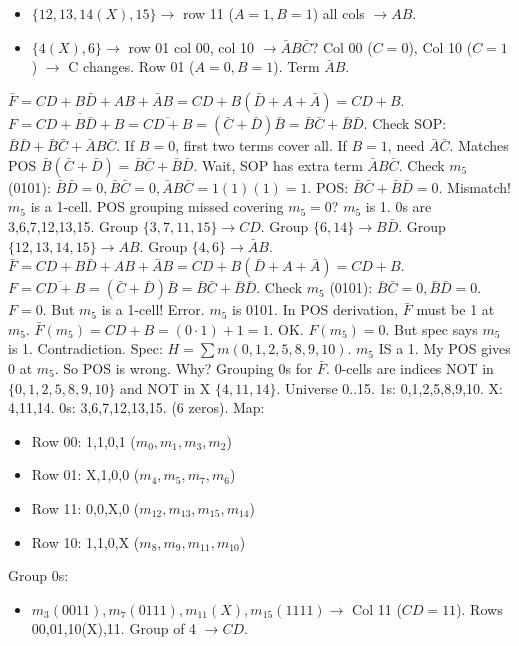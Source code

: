 \documentclass[11pt]{article}
\begin{document}
\begin{corrige}[Exercise 1]
\begin{itemize}
   \item $\{12,13,14(X),15\} \to$ row 11 ($A=1,B=1$) all cols $\to AB$.
   \item $\{4(X),6\} \to$ row 01 col 00, col 10 $\to \bar{A}B\bar{C}$? Col 00 ($C=0$), Col 10 ($C=1$) $\to$ C changes. Row 01 ($A=0,B=1$). Term $\bar{A}B$.
   \end{itemize}
   $\bar{F} = CD + B\bar{D} + AB + \bar{A}B = CD + B(\bar{D}+A+\bar{A}) = CD + B$.
   $F = \overline{CD + B\bar{D} + B} = \overline{CD + B} = (\bar{C}+\bar{D})\bar{B} = \bar{B}\bar{C} + \bar{B}\bar{D}$.
   Check SOP: $\bar{B}\bar{D} + \bar{B}\bar{C} + \bar{A}B\bar{C}$. If $B=0$, first two terms cover all. If $B=1$, need $\bar{A}\bar{C}$. Matches POS $\bar{B}(\bar{C}+\bar{D}) = \bar{B}\bar{C}+\bar{B}\bar{D}$. Wait, SOP has extra term $\bar{A}B\bar{C}$.
   Check $m_5$ (0101): $\bar{B}\bar{D}=0, \bar{B}\bar{C}=0, \bar{A}B\bar{C}=1(1)(1)=1$. POS: $\bar{B}\bar{C}+\bar{B}\bar{D} = 0$. Mismatch! $m_5$ is a 1-cell.
   POS grouping missed covering $m_5=0$? $m_5$ is 1. 0s are 3,6,7,12,13,15.
   Group $\{3,7,11,15\} \to CD$.
   Group $\{6,14\} \to B\bar{D}$.
   Group $\{12,13,14,15\} \to AB$.
   Group $\{4,6\} \to \bar{A}B$.
   $\bar{F} = CD + B\bar{D} + AB + \bar{A}B = CD + B(\bar{D}+A+\bar{A}) = CD + B$.
   $F = \overline{CD+B} = (\bar{C}+\bar{D})\bar{B} = \bar{B}\bar{C} + \bar{B}\bar{D}$.
   Check $m_5$ (0101): $\bar{B}\bar{C}=0, \bar{B}\bar{D}=0$. $F=0$. But $m_5$ is a 1-cell! Error.
   $m_5$ is 0101. In POS derivation, $\bar{F}$ must be 1 at $m_5$.
   $\bar{F}(m_5) = CD + B = (0\cdot1) + 1 = 1$. OK.
   $F(m_5) = 0$. But spec says $m_5$ is 1. Contradiction.
   Spec: $H = \sum m(0,1,2,5,8,9,10)$. $m_5$ IS a 1.
   My POS gives 0 at $m_5$. So POS is wrong.
   Why? Grouping 0s for $\bar{F}$. 0-cells are indices NOT in $\{0,1,2,5,8,9,10\}$ and NOT in X $\{4,11,14\}$.
   Universe 0..15. 1s: 0,1,2,5,8,9,10. X: 4,11,14.
   0s: 3,6,7,12,13,15. (6 zeros).
   Map:
   \begin{itemize}
   \item Row 00: 1,1,0,1 ($m_0,m_1,m_3,m_2$)
   \item Row 01: X,1,0,0 ($m_4,m_5,m_7,m_6$)
   \item Row 11: 0,0,X,0 ($m_{12},m_{13},m_{15},m_{14}$)
   \item Row 10: 1,1,0,X ($m_8,m_9,m_{11},m_{10}$)
   \end{itemize}
   Group 0s:
   \begin{itemize}
   \item $m_3(0011), m_7(0111), m_{11}(X), m_{15}(1111) \to$ Col 11 ($CD=11$). Rows 00,01,10(X),11. Group of 4 $\to CD$.

\end{itemize}
\end{corrige}
\end{document}
